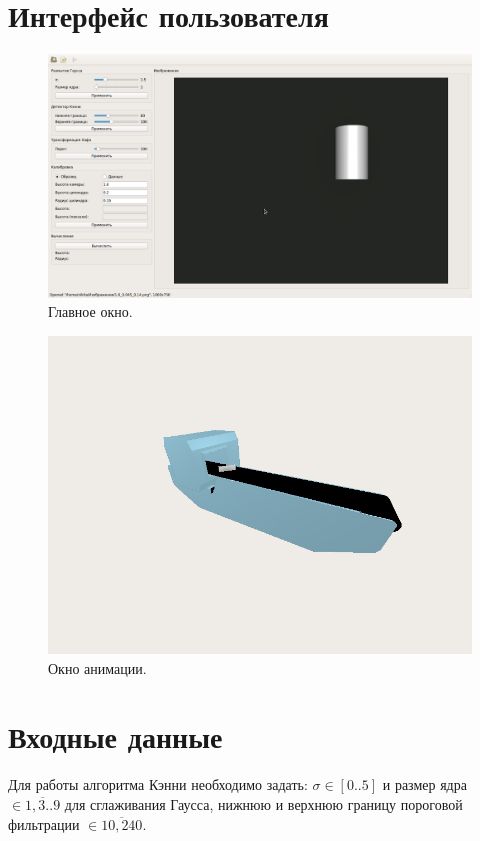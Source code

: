 \section{Интерфейс пользователя}
\begin{figure}[H]
	\centering
	{
		\includegraphics[scale=0.28,valign=t]{img/screen1.png}
		\caption{Главное окно.}
		\label{struct:mainwindow}}
\end{figure}
\begin{figure}[H]
	\centering
	{
		\includegraphics[scale=0.28,valign=t]{img/screen2.png}
		\caption{Окно анимации.}
		\label{struct:animation}}
\end{figure}

\section{Входные данные}
Для работы алгоритма Кэнни необходимо задать: \(\sigma \in [0..5]\) и размер ядра \(\in \overline{1,3..9}\) для сглаживания Гаусса, нижнюю и верхнюю границу пороговой фильтрации \(\in \overline{10,240}\).

